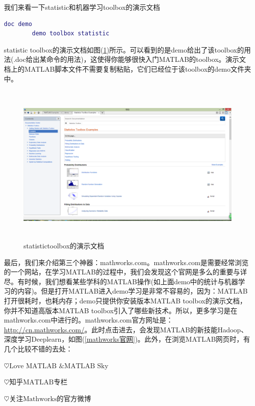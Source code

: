         \par
        我们来看一下statistic和机器学习toolbox的演示文档
        \begin{lstlisting}[language = Matlab]
        doc demo
        demo toolbox statistic
        \end{lstlisting}
        statistic toolbox的演示文档如图(\ref{fig:statistictoolbox的演示文档})所示。可以看到的是demo给出了该toolbox的用法(.doc给出某命令的用法)，这使得你能够很快入门MATLAB的toolbox。演示文档上的MATLAB脚本文件不需要复制粘贴，它们已经位于该toolbox的demo文件夹中。
        \begin{figure}[H]
        \centering
        \includegraphics[height=8cm]{images/35.jpg}
        \caption{statistictoolbox的演示文档}
        \label{fig:statistictoolbox的演示文档}
        \end{figure}
        \par
        最后，我们来介绍第三个神器：mathworks.com。mathworks.com是需要经常浏览的一个网站，在学习MATLAB的过程中，我们会发现这个官网是多么的重要与详尽。有时候，我们想看某些学科的MATLAB操作(如上面demo中的统计与机器学习的内容)。但是打开MATLAB进入demo学习是非常不容易的，因为：MATLAB打开很耗时，也耗内存；demo只提供你安装版本MATLAB toolbox的演示文档，你并不知道高版本MATLAB toolbox引入了哪些新技术。所以，更多学习是在mathworks.com中进行的。mathworks.com官方网址是：\url{http://cn.mathworks.com/}。此时点击进去，会发现MATLAB的新技能Hadoop、深度学习Deeplearn，如图(\ref{mathworks官网})。此外，在浏览MATLAB网页时，有几个比较不错的去处：
        \par
        $\heartsuit\text{Love MATLAB \& MATLAB Sky}$
        \par
        $\heartsuit\text{知乎MATLAB专栏}$
        \par
        $\heartsuit\text{关注Mathworks的官方微博}$

